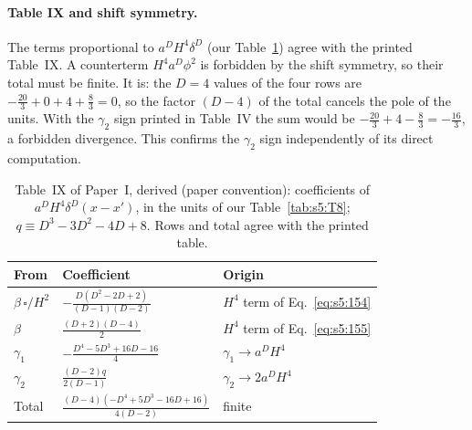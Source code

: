 \documentclass[aps,prd,onecolumn,10pt,nofootinbib,floatfix]{revtex4-2}
\newcommand{\PI}{Paper~I}
\begin{document}
\paragraph*{Table IX and shift symmetry.}
The terms proportional to $a^DH^4\delta^D$ (our Table~\ref{tab:s5:T9}) agree with the printed Table~IX.
A counterterm $H^4a^D\phi^2$ is forbidden by the shift symmetry, so their total must be finite.
It is: the $D=4$ values of the four rows are $-\frac{20}{3}+0+4+\frac83=0$, so the factor $(D-4)$ of the total cancels the pole of the units.
With the $\gamma_2$ sign printed in Table~IV the sum would be $-\frac{20}{3}+4-\frac83=-\frac{16}{3}$, a forbidden divergence.
This confirms the $\gamma_2$ sign independently of its direct computation.

\begin{table}[tb]
\caption{Table~IX of \PI, derived (paper convention): coefficients of $a^DH^4\delta^D(x-x')$, in the units of our Table~\ref{tab:s5:T8}; $q\equiv D^3-3D^2-4D+8$. Rows and total agree with the printed table.}
\label{tab:s5:T9}
\renewcommand{\arraystretch}{1.5}
\begin{ruledtabular}
\begin{tabular}{lll}
From & Coefficient & Origin\\
\hline
$\beta\,\square/H^2$ & $-\frac{D(D^2-2D+2)}{(D-1)(D-2)}$ & $H^4$ term of Eq.~\eqref{eq:s5:154}\\
$\beta$ & $\frac{(D+2)(D-4)}{2}$ & $H^4$ term of Eq.~\eqref{eq:s5:155}\\
$\gamma_1$ & $-\frac{D^4-5D^3+16D-16}{4}$ & $\gamma_1\to a^DH^4$\\
$\gamma_2$ & $\frac{(D-2)q}{2(D-1)}$ & $\gamma_2\to2a^DH^4$\\
\hline
Total & $\frac{(D-4)(-D^4+5D^3-16D+16)}{4(D-2)}$ & finite\\
\end{tabular}
\end{ruledtabular}
\end{table}
\end{document}
